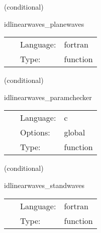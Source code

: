 \documentclass{article}
\begin{document}
\vspace{5mm}

   (conditional) 

\hspace{5mm} idlinearwaves\_planewaves 

\hspace{5mm}{\it construct linear planewave initial data } 


\hspace{5mm}

 \begin{tabular*}{160mm}{cll} 
~ & Language:  & fortran \\ 
~ & Type:  & function \\ 
\end{tabular*} 


\vspace{5mm}

   (conditional) 

\hspace{5mm} idlinearwaves\_paramchecker 

\hspace{5mm}{\it check that the metric\_type is recognised } 


\hspace{5mm}

 \begin{tabular*}{160mm}{cll} 
~ & Language:  & c \\ 
~ & Options:  & global \\ 
~ & Type:  & function \\ 
\end{tabular*} 


\vspace{5mm}

   (conditional) 

\hspace{5mm} idlinearwaves\_standwaves 

\hspace{5mm}{\it construct linear planewave initial data } 


\hspace{5mm}

 \begin{tabular*}{160mm}{cll} 
~ & Language:  & fortran \\ 
~ & Type:  & function \\ 
\end{tabular*} 
\end{document}
